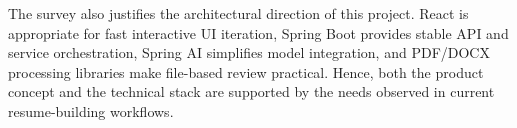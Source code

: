 \noindent The survey also justifies the architectural direction of this project. React is appropriate for fast interactive UI iteration, Spring Boot provides stable API and service orchestration, Spring AI simplifies model integration, and PDF/DOCX processing libraries make file-based review practical. Hence, both the product concept and the technical stack are supported by the needs observed in current resume-building workflows.
